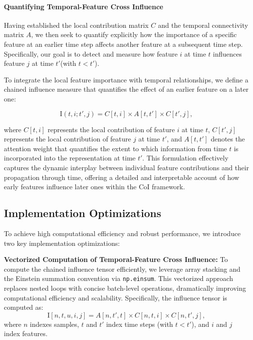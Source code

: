 \documentclass[letterpaper]{article}
\begin{document}
\begin{enumerate}
\paragraph{Quantifying Temporal-Feature Cross Influence}

Having established the local contribution matrix \( C \) and the temporal connectivity matrix \( A \), we then seek to quantify explicitly how the importance of a specific feature at an earlier time step affects another feature at a subsequent time step. Specifically, our goal is to detect and measure how feature \( i \) at time \( t \) influences feature \( j \) at time \( t' \)(with \( t < t' \)). 

To integrate the local feature importance with temporal relationships, we define a chained influence measure that quantifies the effect of an earlier feature on a later one:

\[
\text{I}(t, i; t', j) = C[t, i] \times A[t, t'] \times C[t', j],
\]

where \( C[t, i] \) represents the local contribution of feature \( i \) at time \( t \), \( C[t', j] \) represents the local contribution of feature \( j \) at time \( t' \), and \( A[t, t'] \) denotes the attention weight that quantifies the extent to which information from time \( t \) is incorporated into the representation at time \( t' \). This formulation effectively captures the dynamic interplay between individual feature contributions and their propagation through time, offering a detailed and interpretable account of how early features influence later ones within the CoI framework.

\subsection{Implementation Optimizations}

To achieve high computational efficiency and robust performance, we introduce two key implementation optimizations:

\textbf{Vectorized Computation of Temporal-Feature Cross Influence:}  
To compute the chained influence tensor efficiently, we leverage array stacking and the Einstein summation convention via \texttt{np.einsum}. This vectorized approach replaces nested loops with concise batch-level operations, dramatically improving computational efficiency and scalability. Specifically, the influence tensor is computed as:
\[
\mathrm{I}[n, t, u, i, j] = A[n, t', t] \times C[n, t, i] \times C[n, t', j],
\]
where \( n \) indexes samples, \( t \) and \( t' \) index time steps (with \( t < t' \)), and \( i \) and \( j \) index features.


\end{enumerate}
\end{document}
